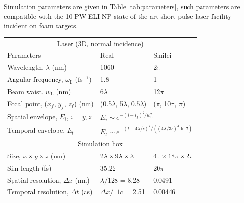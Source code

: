 Simulation parameters are given in Table \ref{tab:parameters}, such parameters are compatible with the 10 PW ELI-NP state-of-the-art short pulse laser facility \cite{tanakaCurrentStatusHighlights2020} incident on foam targets.
\begin{table}[]
	\begin{center}
	\begin{tabular}{lll}
		\hline \hline
		\multicolumn{3}{c}{Laser (3D, normal incidence)}   \\
		Parameters                                        & Real                                 & Smilei                         \\ \hline
		Wavelength, $\lambda$ (nm)                        & 1060                                 & 2$\pi$                      \\
		Angular frequency, $\omega_\mathrm{L}$ (fs$^{-1}$)         & 1.8                                  & 1                           \\
		Beam waist, $w_\mathrm{L}$ (nm)                            & 6$\lambda$                           & 12$\pi$                     \\
		Focal point, ($x_f$, $y_f$, $z_f$) (nm)                  & (0.5$\lambda$, 5$\lambda$, $0.5\lambda$)             & ($\pi$, 10$\pi$, $\pi$)           \vspace{0.25cm}\\ 
		Spatial envelope, $E_i$, $i = y,z$                           & \multicolumn{2}{l}{$E_i \sim e^{-(i-i_f)^2/w_\mathrm{L}^2}$}                \\
		Temporal envelope, $E_t$                          & \multicolumn{2}{l}{$E_t \sim e^{-(t-4\lambda/c)^2/((4\lambda/3c)^2\ln 2)}$} \vspace{0.15cm}\\ \hline \hline
		\multicolumn{3}{c}{Simulation box}   \\ \hline
		Size, $x \times y\times z$ (nm)                           & $2\lambda \times 9\lambda \times \lambda$          & $4\pi \times 18\pi \times 2\pi$         \\
		Sim length (fs)                                   & 35.22                                & 20$\pi$                     \\
		Spatial resolution, $\Delta x$ (nm)               & $\lambda/128$ = 8.28                 & 0.0491                      \\
		Temporal resolution, $\Delta t$ (as)              & $\Delta x/11c$ = 2.51               & 0.00446                   \vspace{0.15cm}  \\ \hline \hline

\end{tabular}
\end{center}
\end{table}
